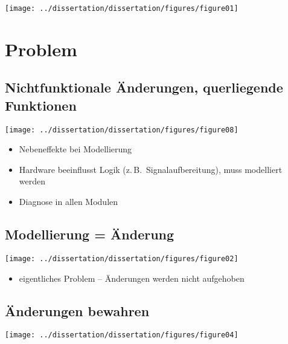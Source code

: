 	\begin{frame}{\insertsectionhead}{\insertsubsectionhead}
		\hfil\texttt{[image: ../dissertation/dissertation/figures/figure01]}\hfil
	\end{frame}

	\section{Problem}

	\subsection{Nichtfunktionale Änderungen, querliegende Funktionen}

	\begin{frame}{\insertsectionhead}{\insertsubsectionhead}
		\hfil\texttt{[image: ../dissertation/dissertation/figures/figure08]}\hfil
	\end{frame}

	\begin{itemize}
		\item Nebeneffekte bei Modellierung
		\item Hardware beeinflusst Logik (z.\,B.\ Signalaufbereitung), muss modelliert werden
		\item Diagnose in allen Modulen
	\end{itemize}

	\subsection{Modellierung = Änderung}

	\begin{frame}{\insertsectionhead}{\insertsubsectionhead}
		\hfil\texttt{[image: ../dissertation/dissertation/figures/figure02]}\hfil
	\end{frame}

	\begin{itemize}
		\item eigentliches Problem -- Änderungen werden nicht aufgehoben
	\end{itemize}

	\subsection{Änderungen bewahren}

	\begin{frame}{\insertsectionhead}{\insertsubsectionhead}
		\hfil\texttt{[image: ../dissertation/dissertation/figures/figure04]}\hfil
	\end{frame}

